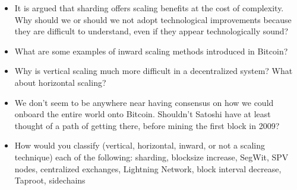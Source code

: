 \begin{itemize}
\item
  It is argued that sharding offers scaling benefits at the cost of
  complexity. Why should we or should we not adopt technological
  improvements because they are difficult to understand, even if they
  appear technologically sound?
\item
  What are some examples of inward scaling methods introduced in
  Bitcoin?
\item
  Why is vertical scaling much more difficult in a decentralized system?
  What about horizontal scaling?
\item
  We don't seem to be anywhere near having consensus on how we could
  onboard the entire world onto Bitcoin. Shouldn't Satoshi have at least
  thought of a path of getting there, before mining the first block in
  2009?
\item
  How would you classify (vertical, horizontal, inward, or not a scaling
  technique) each of the following: sharding, blocksize increase,
  SegWit, SPV nodes, centralized exchanges, Lightning Network, block
  interval decrease, Taproot, sidechains
\end{itemize}
